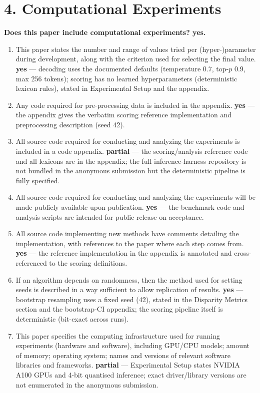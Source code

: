 \documentclass[letterpaper]{article}
\begin{document}
\section*{4. Computational Experiments}
\noindent \textbf{Does this paper include computational experiments? yes.}
\begin{enumerate}[leftmargin=*]
\item This paper states the number and range of values tried per (hyper-)parameter during development, along with the criterion used for selecting the final value. \textbf{yes} --- decoding uses the documented defaults (temperature 0.7, top-$p$ 0.9, max 256 tokens); scoring has no learned hyperparameters (deterministic lexicon rules), stated in Experimental Setup and the appendix.
\item Any code required for pre-processing data is included in the appendix. \textbf{yes} --- the appendix gives the verbatim scoring reference implementation and preprocessing description (seed 42).
\item All source code required for conducting and analyzing the experiments is included in a code appendix. \textbf{partial} --- the scoring/analysis reference code and all lexicons are in the appendix; the full inference-harness repository is not bundled in the anonymous submission but the deterministic pipeline is fully specified.
\item All source code required for conducting and analyzing the experiments will be made publicly available upon publication. \textbf{yes} --- the benchmark code and analysis scripts are intended for public release on acceptance.
\item All source code implementing new methods have comments detailing the implementation, with references to the paper where each step comes from. \textbf{yes} --- the reference implementation in the appendix is annotated and cross-referenced to the scoring definitions.
\item If an algorithm depends on randomness, then the method used for setting seeds is described in a way sufficient to allow replication of results. \textbf{yes} --- bootstrap resampling uses a fixed seed (42), stated in the Disparity Metrics section and the bootstrap-CI appendix; the scoring pipeline itself is deterministic (bit-exact across runs).
\item This paper specifies the computing infrastructure used for running experiments (hardware and software), including GPU/CPU models; amount of memory; operating system; names and versions of relevant software libraries and frameworks. \textbf{partial} --- Experimental Setup states NVIDIA A100 GPUs and 4-bit quantised inference; exact driver/library versions are not enumerated in the anonymous submission.

\end{enumerate}
\end{document}
